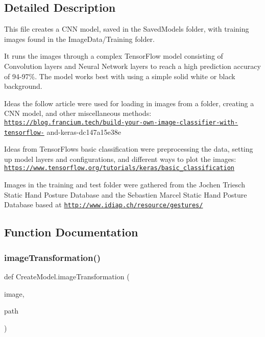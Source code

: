 \subsection{Detailed Description}
This file creates a C\+NN model, saved in the Saved\+Models folder, with training images found in the Image\+Data/\+Training folder. 

It runs the images through a complex Tensor\+Flow model consisting of Convolution layers and Neural Network layers to reach a high prediction accuracy of 94-\/97\%. The model works best with using a simple solid white or black background.

Ideas the follow article were used for loading in images from a folder, creating a C\+NN model, and other miscellaneous methods\+: \href{https://blog.francium.tech/build-your-own-image-classifier-with-tensorflow-}{\tt https\+://blog.\+francium.\+tech/build-\/your-\/own-\/image-\/classifier-\/with-\/tensorflow-\/} and-\/keras-\/dc147a15e38e

Ideas from Tensor\+Flow\textquotesingle{}s basic classification were preprocessing the data, setting up model layers and configurations, and different ways to plot the images\+: \href{https://www.tensorflow.org/tutorials/keras/basic_classification}{\tt https\+://www.\+tensorflow.\+org/tutorials/keras/basic\+\_\+classification}

Images in the training and test folder were gathered from the Jochen Triesch Static Hand Posture Database and the Sebastien Marcel Static Hand Posture Database based at \href{http://www.idiap.ch/resource/gestures/}{\tt http\+://www.\+idiap.\+ch/resource/gestures/} 

\subsection{Function Documentation}
\mbox{\label{namespaceCreateModel_afbe2ef216c8769c9300c48038330bdce}} 
\subsubsection{\texorpdfstring{image\+Transformation()}{imageTransformation()}}
{\footnotesize\ttfamily def Create\+Model.\+image\+Transformation (\begin{DoxyParamCaption}\item[{}]{image,  }\item[{}]{path }\end{DoxyParamCaption})}



